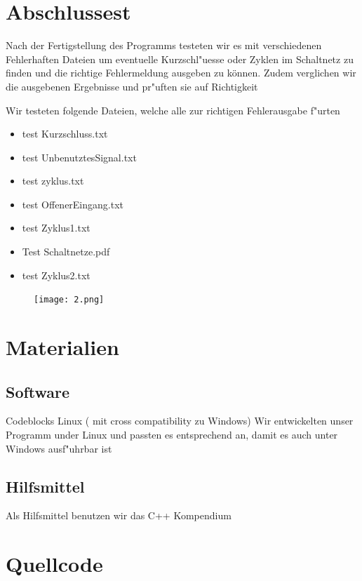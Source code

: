 \documentclass[a4paper,10pt,twoside]{report}
\newcounter{ausgabe}[chapter]
\begin{document}
\section{Abschlussest}
Nach der Fertigstellung des Programms testeten wir es mit verschiedenen Fehlerhaften Dateien um eventuelle Kurzschl"uesse oder Zyklen im Schaltnetz zu finden und die richtige Fehlermeldung ausgeben zu können. Zudem verglichen wir die ausgebenen Ergebnisse und pr"uften sie auf Richtigkeit

Wir testeten folgende Dateien, welche alle zur richtigen Fehlerausgabe f"urten 
	\begin{itemize}
	\item test Kurzschluss.txt 
	\item test UnbenutztesSignal.txt 
	\item test zyklus.txt
	\item test OffenerEingang.txt  
	\item test Zyklus1.txt           
	\item Test Schaltnetze.pdf     
	\item test Zyklus2.txt           

	\end{itemize}

\begin{figure}[htp]
\centering
\texttt{[image: 2.png]}
\caption{}
\label{}
\end{figure}
\newpage
\section{Materialien}
 \subsection{Software}
 	 Codeblocks Linux ( mit cross compatibility zu Windows)
 	 Wir entwickelten unser Programm under Linux und passten es entsprechend an, damit es auch unter Windows ausf"uhrbar ist
 \subsection{Hilfsmittel}
 	Als Hilfsmittel benutzen wir das C++ Kompendium

\newpage
\section{Quellcode}

\end{document}
